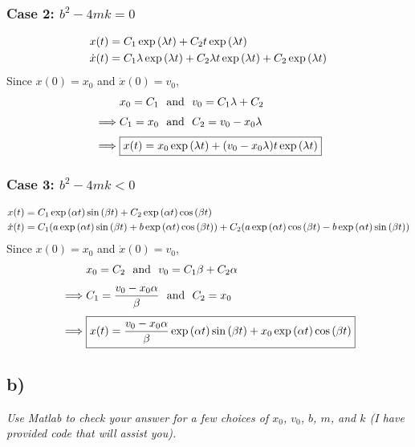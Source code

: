 \documentclass[12pt]{article}
\begin{document}
\subsubsection*{Case 2: $b^2 - 4mk = 0$}
\begin{align*}
	x(t) &= C_1\exp\qty(\lambda t) + C_2t\exp\qty(\lambda t) \\
	\dot{x}(t) &= C_1\lambda\exp\qty(\lambda t) + C_2\lambda t\exp\qty(\lambda t) + C_2\exp\qty(\lambda t)
\end{align*}
Since $x(0) = x_0$ and $\dot{x}(0) = v_0$,
\begin{align*}
	&x_0 = C_1\ \ \text{and}\ \ v_0 = C_1\lambda + C_2 \\[.1cm]
	\implies &C_1 = x_0\ \ \text{and}\ \ C_2 = v_0 - x_0\lambda \\[.1cm]
	\implies &\boxed{x(t) = x_0\exp\qty(\lambda t) + (v_0 - x_0\lambda)t\exp\qty(\lambda t)}
\end{align*}

\subsubsection*{Case 3: $b^2 - 4mk < 0$}
\begin{align*}
	x(t) &= C_1\exp\qty(\alpha t)\sin\qty(\beta t) + C_2\exp\qty(\alpha t)\cos\qty(\beta t) \\
	\dot{x}(t) &= C_1\qty(a\exp\qty(\alpha t)\sin\qty(\beta t) + b\exp\qty(\alpha t)\cos\qty(\beta t)) + C_2\qty(a\exp\qty(\alpha t)\cos\qty(\beta t) - b\exp\qty(\alpha t)\sin\qty(\beta t))
\end{align*}
Since $x(0) = x_0$ and $\dot{x}(0) = v_0$,
\begin{align*}
	&x_0 = C_2\ \ \text{and}\ \ v_0 = C_1 \beta + C_2 \alpha \\[.1cm]
	\implies &C_1 = \frac{v_0 - x_0 \alpha}{\beta}\ \ \text{and}\ \ C_2 = x_0 \\[.1cm]
	\implies &\boxed{x(t) = \frac{v_0 - x_0 \alpha}{\beta}\exp\qty(\alpha t)\sin\qty(\beta t) + x_0\exp\qty(\alpha t)\cos\qty(\beta t)}
\end{align*}

\subsection*{ b)}
{\it Use Matlab to check your answer for a few choices of $x_0$, $v_0$, $b$, $m$, and $k$ (I have provided code that will assist you).}
\end{document}
